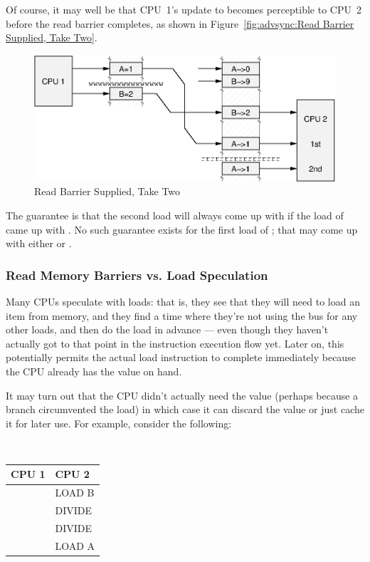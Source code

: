 Of course, it may well be that CPU~1's update to  becomes perceptible
to CPU~2 before the read barrier completes, as shown in
Figure~\ref{fig:advsync:Read Barrier Supplied, Take Two}.

\begin{figure}[htb]
\centering
\includegraphics{advsync/ReadBarrierSupplied2}
\caption{Read Barrier Supplied, Take Two}
\end{figure}

The guarantee is that the second load will always come up with 
if the
load of  came up with .
No such guarantee exists for the first load of
; that may come up with either  or .

\subsubsection{Read Memory Barriers vs. Load Speculation}
\label{sec:advsync:Read Memory Barriers vs. Load Speculation}

Many CPUs speculate with loads: that is, they see that they will need to
load an item from memory, and they find a time where they're not using
the bus for any other loads, and then do the load in advance --- even though
they haven't actually got to that point in the instruction execution
flow yet.
Later on, this potentially permits the actual load instruction to
complete immediately because the CPU already has the value on hand.

It may turn out that the CPU didn't actually need the value (perhaps because a
branch circumvented the load) in which case it can discard the value or just
cache it for later use.
For example, consider the following:

\vspace{5pt}
\begin{minipage}[t]{\columnwidth}
\tt
\scriptsize
\begin{tabular}{l|p{1.5in}}
	CPU 1 &		CPU 2 \\
	\hline
		&	LOAD B \\
		&	DIVIDE \\
		&	DIVIDE \\
		&	LOAD A \\
\end{tabular}
\end{minipage}
\vspace{5pt}


